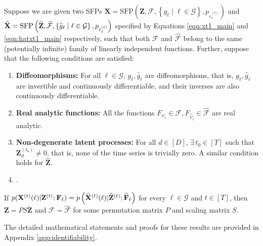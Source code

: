 \begin{theorem} \label{thm:nonlinear_identifiability}
    Suppose we are given two SFPs $\mathbf{X} = \text{SFP}\left(\mathbf{Z}, \mathcal{F}, \left\{ g_{\ell} \mid \ell \in \mathcal{G} \right\}, p_{\varepsilon_{\ell}^{(t)}} \right)$ and $\widehat{\mathbf{X}} = \text{SFP}\left(\widehat{\mathbf{Z}}, \widehat{\mathcal{F}}, \left\{\widehat{g}_{\ell} \mid \ell \in \mathcal{G} \right\}, {p_{{\varepsilon}_{\ell}^{(t)}}} \right)$ specified by Equations \ref{eqn:xt1_main} and \ref{eqn:hatxt1_main} respectively, such that both $\mathcal{F}$ and $\widehat{\mathcal{F}}$ belong to the same (potentially infinite) family of linearly independent functions. Further, suppose that the following conditions are satisfied: 
    \begin{enumerate}[noitemsep, topsep=0pt]
        \item \textbf{Diffeomorphisms:} For all $\ell \in \mathcal{G}$, $\displaystyle g_{\ell}, \widehat{g}_{\ell}$ are diffeomorphisms, that is, $g_{\ell}, \widehat{g}_{\ell}$ are invertible and continuously differentiable, and their inverses are also continuously differentiable.
        \item \textbf{Real analytic functions:} All the functions $F_{\psi_i} \in \mathcal{F}, F_{\widehat{\psi}_i} \in \widehat{\mathcal{F}}$ are real analytic. 
        \item \textbf{Non-degenerate latent processes:} For all $d \in [D]$,  $\exists \,  t_0 \in [T]$ such that $\mathbf{Z}^{(t_0)}_d \neq 0$, that is, none of the time series is trivially zero. A similar condition holds for $\widehat{\mathbf{Z}}$.
        \item {}.
    \end{enumerate}
     If $p(\mathbf{X}^{(t)}(\ell) | \mathbf{Z}^{(t)} ; \mathbf{F}_{\ell}) = p \left(\widehat{\mathbf{X}}^{(t)}(\ell)| \widehat{\mathbf{Z}}^{(t)}; \widehat{\mathbf{F}}_{\ell} \right)$ for every $\ell \in \mathcal{G}$ and $t \in [T]$, then $\mathbf{Z} = PS\tilde{\mathbf{Z}}$ and $\mathcal{F} = \widehat{\mathcal{F}}$ for some permutation matrix $P$ and scaling matrix $S$. \label{thm:sfp_identifiability}
\end{theorem}
The detailed mathematical statements and proofs for these results are provided in Appendix \ref{app:identifiability}. 



